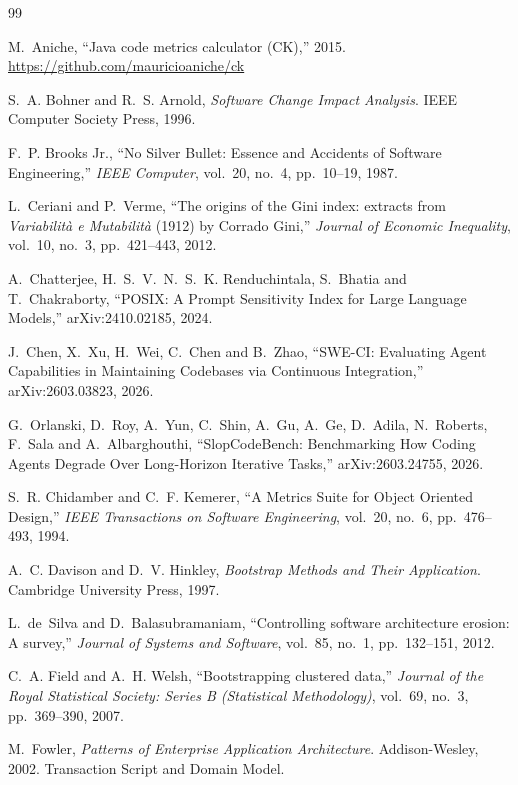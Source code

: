\documentclass[11pt,a4paper]{article}
\begin{document}
\begin{thebibliography}{99}

 M.~Aniche,
  ``Java code metrics calculator (CK),'' 2015.
  \url{https://github.com/mauricioaniche/ck}

 S.~A. Bohner and R.~S. Arnold,
  \emph{Software Change Impact Analysis}. IEEE Computer Society Press, 1996.

 F.~P. Brooks Jr.,
  ``No Silver Bullet: Essence and Accidents of Software Engineering,''
  \emph{IEEE Computer}, vol.~20, no.~4, pp.~10--19, 1987.

 L.~Ceriani and P.~Verme,
  ``The origins of the Gini index: extracts from \emph{Variabilit\`a e
  Mutabilit\`a} (1912) by Corrado Gini,''
  \emph{Journal of Economic Inequality}, vol.~10, no.~3, pp.~421--443, 2012.

 A.~Chatterjee, H.~S.~V.~N.~S.~K. Renduchintala, S.~Bhatia and
  T.~Chakraborty,
  ``POSIX: A Prompt Sensitivity Index for Large Language Models,''
  arXiv:2410.02185, 2024.

 J.~Chen, X.~Xu, H.~Wei, C.~Chen and B.~Zhao,
  ``SWE-CI: Evaluating Agent Capabilities in Maintaining Codebases via
  Continuous Integration,'' arXiv:2603.03823, 2026.

 G.~Orlanski, D.~Roy, A.~Yun, C.~Shin, A.~Gu, A.~Ge,
  D.~Adila, N.~Roberts, F.~Sala and A.~Albarghouthi,
  ``SlopCodeBench: Benchmarking How Coding Agents Degrade Over Long-Horizon
  Iterative Tasks,'' arXiv:2603.24755, 2026.

 S.~R. Chidamber and C.~F. Kemerer,
  ``A Metrics Suite for Object Oriented Design,''
  \emph{IEEE Transactions on Software Engineering}, vol.~20, no.~6,
  pp.~476--493, 1994.

 A.~C. Davison and D.~V. Hinkley,
  \emph{Bootstrap Methods and Their Application}. Cambridge University Press,
  1997.

 L.~de~Silva and D.~Balasubramaniam,
  ``Controlling software architecture erosion: A survey,''
  \emph{Journal of Systems and Software}, vol.~85, no.~1, pp.~132--151, 2012.

 C.~A. Field and A.~H. Welsh,
  ``Bootstrapping clustered data,''
  \emph{Journal of the Royal Statistical Society: Series B (Statistical
  Methodology)}, vol.~69, no.~3, pp.~369--390, 2007.

 M.~Fowler,
  \emph{Patterns of Enterprise Application Architecture}. Addison-Wesley, 2002.
  Transaction Script and Domain Model.


\end{thebibliography}
\end{document}
